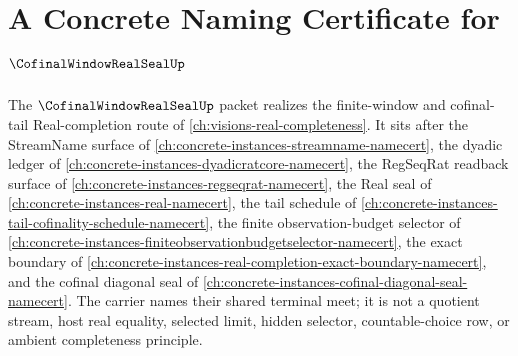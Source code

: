 \chapter{A Concrete Naming Certificate for $\CofinalWindowRealSealUp$}
\label{ch:concrete-instances-cofinal-window-real-seal-namecert}

The $\CofinalWindowRealSealUp$ packet realizes the finite-window and cofinal-tail Real-completion route of \autoref{ch:visions-real-completeness}. It sits after the StreamName surface of \autoref{ch:concrete-instances-streamname-namecert}, the dyadic ledger of \autoref{ch:concrete-instances-dyadicratcore-namecert}, the RegSeqRat readback surface of \autoref{ch:concrete-instances-regseqrat-namecert}, the Real seal of \autoref{ch:concrete-instances-real-namecert}, the tail schedule of \autoref{ch:concrete-instances-tail-cofinality-schedule-namecert}, the finite observation-budget selector of \autoref{ch:concrete-instances-finiteobservationbudgetselector-namecert}, the exact boundary of \autoref{ch:concrete-instances-real-completion-exact-boundary-namecert}, and the cofinal diagonal seal of \autoref{ch:concrete-instances-cofinal-diagonal-seal-namecert}. The carrier names their shared terminal meet; it is not a quotient stream, host real equality, selected limit, hidden selector, countable-choice row, or ambient completeness principle.



